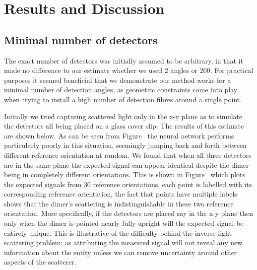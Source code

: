 \documentclass[final,  3p]{elsarticle}
\begin{document}
\section{Results and  Discussion}
\label{sec:Discussion}
\subsection{Minimal number of detectors}
\label{sec:detectors}
The exact number of detectors was initially assumed to be arbitrary, in that it made no difference to our estimate whether we used 2 angles or 200. For practical purposes it seemed beneficial that we demonstrate our method works for a minimal number of detection angles, as geometric constraints come into play when trying to install a high number of detection fibres around a single point. 

Initially we tried capturing scattered light only in the x-y plane as to simulate the detectors all being placed on a glass cover slip. The results of this estimate are shown below. As can be seen from Figure~ the neural network performs particularly poorly in this situation, seemingly jumping back and forth between different reference orientation at random. We found that when all three detectors are in the same plane the expected signal can appear identical despite the dimer being in completely different orientations. This is shown in Figure~ which plots the expected signals from 30 reference orientations, each point is labelled with its corresponding reference orientation, the fact that points have multiple labels shows that the dimer's scattering is indistinguishable in these two reference orientation. More specifically, if the detectors are placed say in the x-y plane then only when the dimer is pointed nearly fully upright will the expected signal be entirely unique. This is illustrative of the difficulty behind the inverse light scattering problem; as attributing the measured signal will not reveal any new information about the entity unless we can remove uncertainty around other aspects of the scatterer. 
\end{document}
